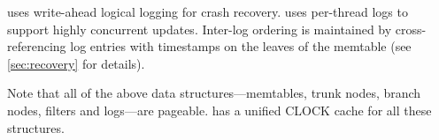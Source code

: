 \sysname uses write-ahead logical logging for crash recovery.
\sysname uses per-thread logs to support highly concurrent updates.
Inter-log ordering is maintained by cross-referencing log entries with
timestamps on the leaves of the memtable (see \cref{sec:recovery} for
details).

Note that all of the above data structures---memtables, trunk nodes,
branch nodes, filters and logs---are pageable.  \sysname has a unified
CLOCK cache for all these structures.
